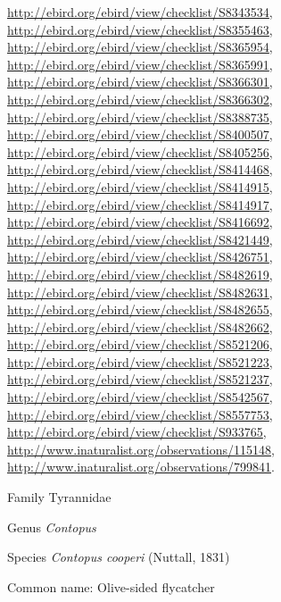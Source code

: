 \documentclass[9pt, article]{memoir}
\begin{document}
\begin{multicols}{2}
\url{http://ebird.org/ebird/view/checklist/S8343534}, 
\url{http://ebird.org/ebird/view/checklist/S8355463}, 
\url{http://ebird.org/ebird/view/checklist/S8365954}, 
\url{http://ebird.org/ebird/view/checklist/S8365991}, 
\url{http://ebird.org/ebird/view/checklist/S8366301}, 
\url{http://ebird.org/ebird/view/checklist/S8366302}, 
\url{http://ebird.org/ebird/view/checklist/S8388735}, 
\url{http://ebird.org/ebird/view/checklist/S8400507}, 
\url{http://ebird.org/ebird/view/checklist/S8405256}, 
\url{http://ebird.org/ebird/view/checklist/S8414468}, 
\url{http://ebird.org/ebird/view/checklist/S8414915}, 
\url{http://ebird.org/ebird/view/checklist/S8414917}, 
\url{http://ebird.org/ebird/view/checklist/S8416692}, 
\url{http://ebird.org/ebird/view/checklist/S8421449}, 
\url{http://ebird.org/ebird/view/checklist/S8426751}, 
\url{http://ebird.org/ebird/view/checklist/S8482619}, 
\url{http://ebird.org/ebird/view/checklist/S8482631}, 
\url{http://ebird.org/ebird/view/checklist/S8482655}, 
\url{http://ebird.org/ebird/view/checklist/S8482662}, 
\url{http://ebird.org/ebird/view/checklist/S8521206}, 
\url{http://ebird.org/ebird/view/checklist/S8521223}, 
\url{http://ebird.org/ebird/view/checklist/S8521237}, 
\url{http://ebird.org/ebird/view/checklist/S8542567}, 
\url{http://ebird.org/ebird/view/checklist/S8557753}, 
\url{http://ebird.org/ebird/view/checklist/S933765}, 
\url{http://www.inaturalist.org/observations/115148}, 
\url{http://www.inaturalist.org/observations/799841}.

\vspace{6pt}\noindent\hspace{24pt}Family Tyrannidae


\vspace{6pt}\noindent\hspace{30pt}Genus \textit{Contopus}


\vspace{6pt}\noindent\hspace{36pt}Species \textit{Contopus cooperi} (Nuttall, 1831)


Common name: Olive-sided flycatcher


\end{multicols}
\end{document}
